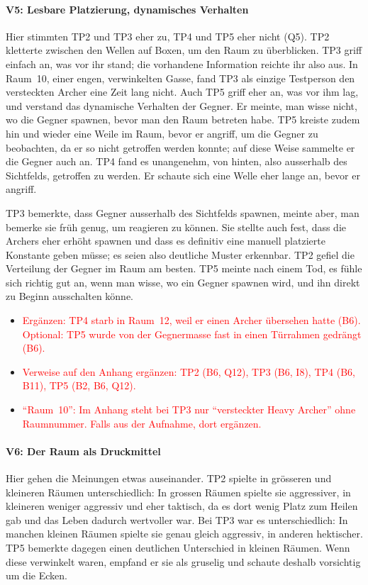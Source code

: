 \documentclass[../Main.tex]{subfiles}
\begin{document}
\paragraph{V5: Lesbare Platzierung, dynamisches Verhalten}
Hier stimmten TP2 und TP3 eher zu, TP4 und TP5 eher nicht (Q5). TP2 kletterte zwischen den Wellen auf Boxen, um den Raum zu überblicken. TP3 griff einfach an, was vor ihr stand; die vorhandene Information reichte ihr also aus. In Raum~10, einer engen, verwinkelten Gasse, fand TP3 als einzige Testperson den versteckten Archer eine Zeit lang nicht. Auch TP5 griff eher an, was vor ihm lag, und verstand das dynamische Verhalten der Gegner. Er meinte, man wisse nicht, wo die Gegner spawnen, bevor man den Raum betreten habe. TP5 kreiste zudem hin und wieder eine Weile im Raum, bevor er angriff, um die Gegner zu beobachten, da er so nicht getroffen werden konnte; auf diese Weise sammelte er die Gegner auch an. TP4 fand es unangenehm, von hinten, also ausserhalb des Sichtfelds, getroffen zu werden. Er schaute sich eine Welle eher lange an, bevor er angriff.

TP3 bemerkte, dass Gegner ausserhalb des Sichtfelds spawnen, meinte aber, man bemerke sie früh genug, um reagieren zu können. Sie stellte auch fest, dass die Archers eher erhöht spawnen und dass es definitiv eine manuell platzierte Konstante geben müsse; es seien also deutliche Muster erkennbar. TP2 gefiel die Verteilung der Gegner im Raum am besten. TP5 meinte nach einem Tod, es fühle sich richtig gut an, wenn man wisse, wo ein Gegner spawnen wird, und ihn direkt zu Beginn ausschalten könne.

\begin{itemize}[leftmargin=1.5cm]
    \item \textcolor{red}{Ergänzen: TP4 starb in Raum~12, weil er einen Archer übersehen hatte (B6). Optional: TP5 wurde von der Gegnermasse fast in einen Türrahmen gedrängt (B6).}
    \item \textcolor{red}{Verweise auf den Anhang ergänzen: TP2 (B6, Q12), TP3 (B6, I8), TP4 (B6, B11), TP5 (B2, B6, Q12).}
    \item \textcolor{red}{\enquote{Raum~10}: Im Anhang steht bei TP3 nur \enquote{versteckter Heavy Archer} ohne Raumnummer. Falls aus der Aufnahme, dort ergänzen.}
\end{itemize}

\paragraph{V6: Der Raum als Druckmittel}
Hier gehen die Meinungen etwas auseinander. TP2 spielte in grösseren und kleineren Räumen unterschiedlich: In grossen Räumen spielte sie aggressiver, in kleineren weniger aggressiv und eher taktisch, da es dort wenig Platz zum Heilen gab und das Leben dadurch wertvoller war. Bei TP3 war es unterschiedlich: In manchen kleinen Räumen spielte sie genau gleich aggressiv, in anderen hektischer. TP5 bemerkte dagegen einen deutlichen Unterschied in kleinen Räumen. Wenn diese verwinkelt waren, empfand er sie als gruselig und schaute deshalb vorsichtig um die Ecken.
\end{document}
